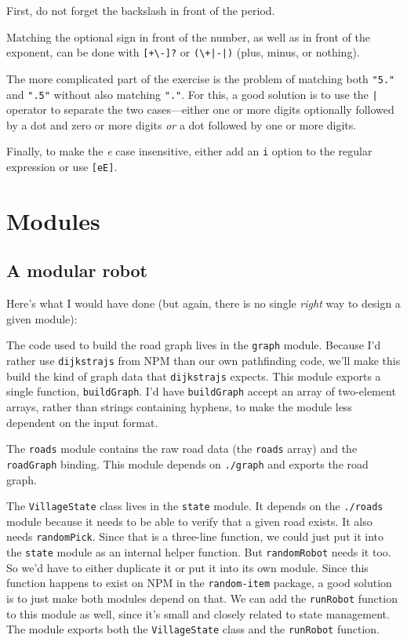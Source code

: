 First, do not forget the backslash in front of the period.

Matching the optional sign in front of the number, as well as in front of the exponent, can be done with \lstinline`[+\-]?` or \lstinline`(\+|-|)` (plus, minus, or nothing).

The more complicated part of the exercise is the problem of matching both \lstinline`"5."` and \lstinline`".5"` without also matching \lstinline`"."`. For this, a good solution is to use the \lstinline`|` operator to separate the two cases—either one or more digits optionally followed by a dot and zero or more digits \emph{or} a dot followed by one or more digits.

Finally, to make the \emph{e} case insensitive, either add an \lstinline`i` option to the regular expression or use \lstinline`[eE]`.

\section{Modules}

\subsection{A modular robot}

Here's what I would have done (but again, there is no single \emph{right} way to design a given module):

The code used to build the road graph lives in the \lstinline`graph` module. Because I'd rather use \lstinline`dijkstrajs` from NPM than our own pathfinding code, we'll make this build the kind of graph data that \lstinline`dijkstrajs` expects. This module exports a single function, \lstinline`buildGraph`. I'd have \lstinline`buildGraph` accept an array of two-element arrays, rather than strings containing hyphens, to make the module less dependent on the input format.

The \lstinline`roads` module contains the raw road data (the \lstinline`roads` array) and the \lstinline`roadGraph` binding. This module depends on \lstinline`./graph` and exports the road graph.

The \lstinline`VillageState` class lives in the \lstinline`state` module. It depends on the \lstinline`./roads` module because it needs to be able to verify that a given road exists. It also needs \lstinline`randomPick`. Since that is a three-line function, we could just put it into the \lstinline`state` module as an internal helper function. But \lstinline`randomRobot` needs it too. So we'd have to either duplicate it or put it into its own module. Since this function happens to exist on NPM in the \lstinline`random-item` package, a good solution is to just make both modules depend on that. We can add the \lstinline`runRobot` function to this module as well, since it's small and closely related to state management. The module exports both the \lstinline`VillageState` class and the \lstinline`runRobot` function.

